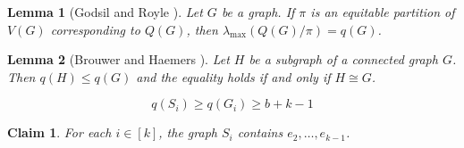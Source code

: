 \documentclass[10pt,a4paper]{amsart}
\newtheorem{lemma}{Lemma}
\newtheorem{claim}{Claim}
\begin{document}
\begin{lemma}[Godsil and Royle \cite{Godsil}]\label{lemma5b}
Let $G$ be a graph. If $\pi$ is an equitable partition of $V(G)$ corresponding to $Q(G)$, then $\lambda_{\max}(Q(G)/\pi)=q(G)$.
\end{lemma}

\begin{lemma}[Brouwer and Haemers \cite{Brouwer}]\label{lemma6b}
Let $H$ be a subgraph of a connected graph $G$. Then $q(H)\le q(G)$ and the equality holds if and only if $H \cong G$.
\end{lemma}

\begin{equation}
\label{eq:shift-lower}
q(S_i)\ge q(G_i)\ge b+k-1
\end{equation}

\begin{claim}\label{claim1a}
For each $i\in[k]$, the graph $S_i$ contains $e_2,\ldots,e_{k-1}$.
\end{claim}
\end{document}
